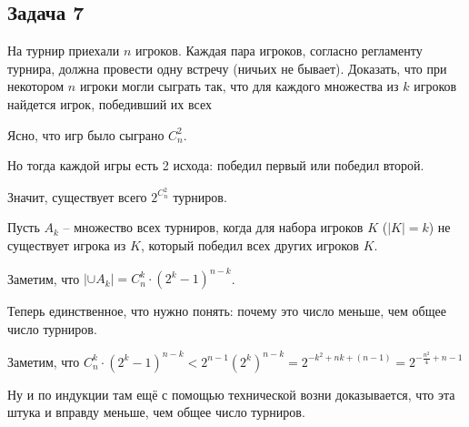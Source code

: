 \subsection{Задача 7}

На турнир приехали $n$ игроков. Каждая пара игроков, согласно регламенту турнира,
должна провести одну встречу (ничьих не бывает). Доказать, что при некотором $n$
игроки могли сыграть так, что для каждого множества из $k$ игроков найдется игрок,
победивший их всех

Ясно, что игр было сыграно $C^2_n$.

Но тогда каждой игры есть 2 исхода: победил первый или победил второй.

Значит, существует всего $\displaystyle 2^{C^2_n}$ турниров.

Пусть $A_k$ -- множество всех турниров, когда для  набора игроков $K$ ($|K| = k$) не существует игрока из $K$, который победил всех других игроков $K$.

Заметим, что $|\cup A_k| = C^k_n \cdot (2^k - 1)^{n - k}$.

Теперь единственное, что нужно понять: почему это число меньше, чем общее число турниров.

Заметим, что $C^k_n \cdot (2^k - 1)^{n - k} < 2^{n-1} (2^k)^{n-k} = 2^{-k^2 + nk + (n - 1)} = 2^{-\frac{n^2}{4} + n - 1}$

Ну и по индукции там ещё с помощью технической возни доказывается, что эта штука и вправду меньше, чем общее число турниров.